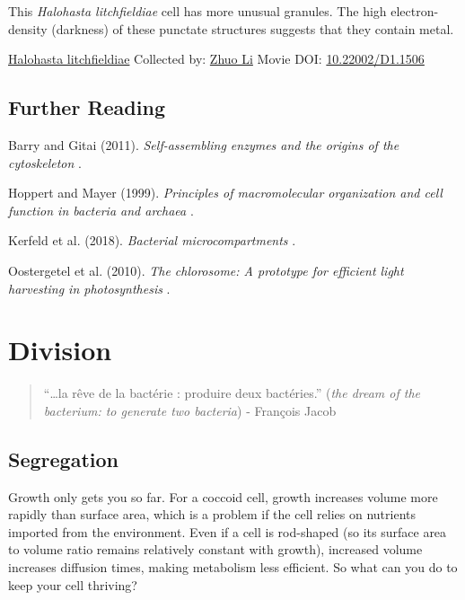 \documentclass[]{tufte-book}
\begin{document}
This \emph{Halohasta litchfieldiae} cell has more unusual granules. The high electron-density (darkness) of these punctate structures suggests that they contain metal.



\hypertarget{htmlwidget-8639d9243ab3e0af7c27}{}

\label{fig:4-10b}\protect\hyperlink{tree}{Halohasta litchfieldiae} Collected by: \protect\hyperlink{zhuo_li}{Zhuo Li} Movie DOI: \href{https://doi.org/10.22002/D1.1506}{10.22002/D1.1506}

\hypertarget{further-reading-3}{%
\section{Further Reading}\label{further-reading-3}}

Barry and Gitai (2011). \emph{Self-assembling enzymes and the origins of the cytoskeleton} \citep{barry2011}.

Hoppert and Mayer (1999). \emph{Principles of macromolecular organization and cell function in bacteria and archaea} \citep{hoppert1999}.

Kerfeld et al. (2018). \emph{Bacterial microcompartments} \citep{kerfeld2018}.

Oostergetel et al. (2010). \emph{The chlorosome: A prototype for efficient light harvesting in photosynthesis} \citep{oostergetel2010}.

\hypertarget{division}{%
\chapter{Division}\label{division}}

\begin{quote}
``\ldots{}la rêve de la bactérie : produire deux bactéries.'' (\emph{the dream of the bacterium: to generate two bacteria})
- François Jacob \citep{jacob2002a}
\end{quote}

\hypertarget{segregation}{%
\section{Segregation}\label{segregation}}

Growth only gets you so far. For a coccoid cell, growth increases volume more rapidly than surface area, which is a problem if the cell relies on nutrients imported from the environment. Even if a cell is rod-shaped (so its surface area to volume ratio remains relatively constant with growth), increased volume increases diffusion times, making metabolism less efficient. So what can you do to keep your cell thriving?
\end{document}
